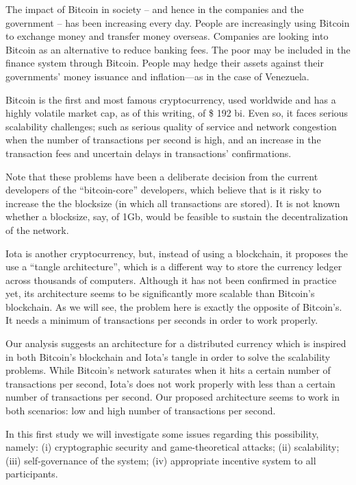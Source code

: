 The impact of Bitcoin in society -- and hence in the companies and the government -- has been increasing every day. People are increasingly using Bitcoin to exchange money and transfer money overseas. Companies are looking into Bitcoin as an alternative to reduce banking fees. The poor may be included in the finance system through Bitcoin. People may hedge their assets against their governments' money issuance and inflation---as in the case of Venezuela.

Bitcoin is the first and most famous cryptocurrency, used worldwide and has a highly volatile market cap, as of this writing, of \$ 192 bi. Even so, it faces serious scalability challenges; such as serious quality of service and network congestion when the number of transactions per second is high, and an increase in the transaction fees and uncertain delays in transactions' confirmations.

Note that these problems have been a deliberate decision from the current developers of the ``bitcoin-core'' developers, which believe that is it risky to increase the the blocksize (in which all transactions are stored).  It is not known whether a blocksize, say, of 1Gb, would be feasible to sustain the decentralization of the network. 

Iota is another cryptocurrency, but, instead of using a blockchain, it proposes the use a ``tangle architecture'', which is a different way to store the currency ledger across thousands of computers. Although it has not been confirmed in practice yet, its architecture seems to be significantly more scalable than Bitcoin's blockchain. As we will see, the problem here is exactly the opposite of Bitcoin's. It needs a minimum of transactions per seconds in order to work properly.

Our analysis suggests an architecture for a distributed currency which is inspired in both Bitcoin's blockchain and Iota's tangle in order to solve the scalability problems. While Bitcoin's network saturates when it hits a certain number of transactions per second, Iota's does not work properly with less than a certain number of transactions per second. Our proposed architecture seems to work in both scenarios: low and high number of transactions per second.

In this first study we will investigate some issues regarding this possibility, namely: (i) cryptographic security and game-theoretical attacks; (ii) scalability; (iii) self-governance of the system; (iv) appropriate incentive system to all participants.

